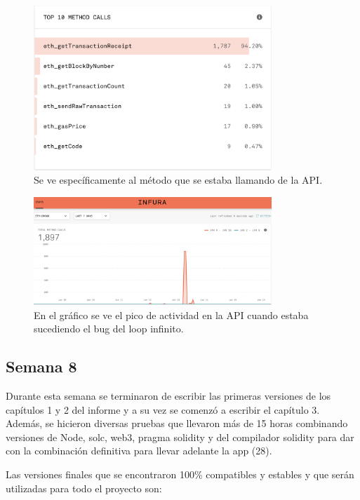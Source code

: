 \begin{figure}[htbp!] 
\centering    
\includegraphics[width=0.8\textwidth]{infura-calls-2}
\caption[infuracalls2]{Se ve específicamente al método que se estaba llamando de la API.}
\label{fig:infura-calls-2}
\end{figure}

\begin{figure}[htbp!] 
\centering    
\includegraphics[width=0.8\textwidth]{infura-calls-3}
\caption[infuracalls3]{En el gráfico se ve el pico de actividad en la API cuando estaba sucediendo el bug del loop infinito.}
\label{fig:infura-calls-3}
\end{figure}


\subsection{Semana 8}
Durante esta semana se terminaron de escribir las primeras versiones de los capítulos 1 y 2
del informe y a su vez se comenzó a escribir el capítulo 3. Además, se hicieron diversas pruebas 
que llevaron más de 15 horas combinando versiones de Node, solc, web3, pragma solidity y del
compilador solidity para dar con la combinación definitiva para llevar adelante la app (28).

Las versiones finales que se encontraron 100\% compatibles y estables y que serán utilizadas para
todo el proyecto son:

